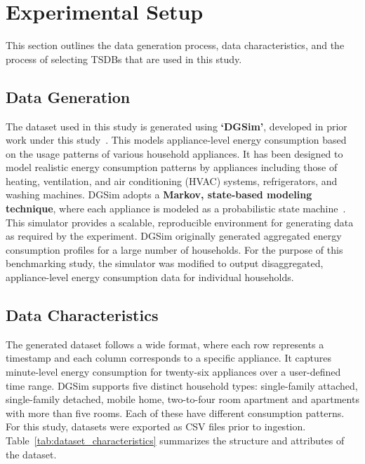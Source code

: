 \documentclass[conference]{IEEEtran}
\begin{document}
\section{Experimental Setup}\label{sec:setup}
This section outlines the data generation process, data characteristics, and the process of selecting TSDBs that are used in this study.
\subsection{Data Generation}
The dataset used in this study is generated using \textbf{`DGSim'}, developed in prior work under this study~\cite{17_DGSim}. This models appliance-level energy consumption based on the usage patterns of various household appliances. It has been designed to model realistic energy consumption patterns by appliances including those of heating, ventilation, and air conditioning (HVAC) systems, refrigerators, and washing machines. DGSim adopts a \textbf{Markov, state-based modeling technique}, where each appliance is modeled as a probabilistic state machine~\cite{12_zucchini2016hmm}. This simulator provides a scalable, reproducible environment for generating data as required by the experiment. 
DGSim originally generated aggregated energy consumption profiles for a large number of households. For the purpose of this benchmarking study, the simulator was modified to output disaggregated, appliance-level energy consumption data for individual households.
\subsection{Data Characteristics}
The generated dataset follows a wide format, where each row represents a timestamp and each column corresponds to a specific appliance. It captures minute-level energy consumption for twenty-six appliances over a user-defined time range. DGSim supports five distinct household types: single-family attached, single-family detached, mobile home, two-to-four room apartment and apartments with more than five rooms. Each of these have different consumption patterns.
For this study, datasets were exported as CSV files prior to ingestion. Table~\ref{tab:dataset_characteristics} summarizes the structure and attributes of the dataset.
\end{document}
